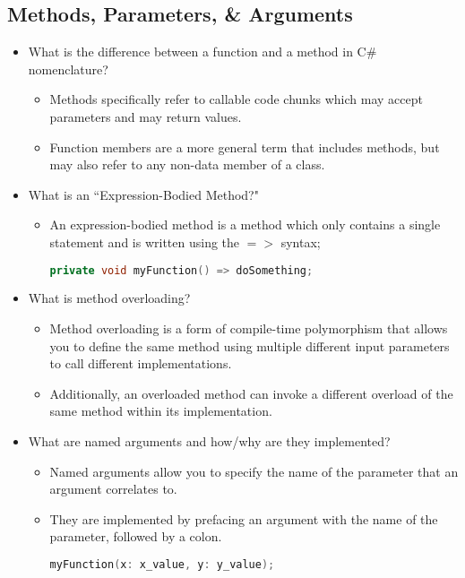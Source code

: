 \documentclass{article}
\begin{document}
\subsection{Methods, Parameters, \& Arguments}
\begin{itemize}
    \item What is the difference between a function and a method in C\# nomenclature?
    \begin{itemize}
        \item Methods specifically refer to callable code chunks which may accept parameters and may return values.
        \item Function members are a more general term that includes methods, but may also refer to any non-data member of a class.
    \end{itemize}
    \item What is an ``Expression-Bodied Method?"
    \begin{itemize}
        \item An expression-bodied method is a method which only contains a single statement and is written using the $=>$ syntax;
        \begin{lstlisting}[language=C++]
                private void myFunction() => doSomething;\end{lstlisting}
    \end{itemize}
    \item What is method overloading?
    \begin{itemize}
        \item Method overloading is a form of compile-time polymorphism that allows you to define the same method using multiple different input parameters to call different implementations.
        \item Additionally, an overloaded method can invoke a different overload of the same method within its implementation.
    \end{itemize}
    \item What are named arguments and how/why are they implemented?
    \begin{itemize}
        \item Named arguments allow you to specify the name of the parameter that an argument correlates to.
        \item They are implemented by prefacing an argument with the name of the parameter, followed by a colon.
                \begin{lstlisting}[language=C++]
                myFunction(x: x_value, y: y_value);\end{lstlisting}

\end{itemize}
\end{itemize}
\end{document}
